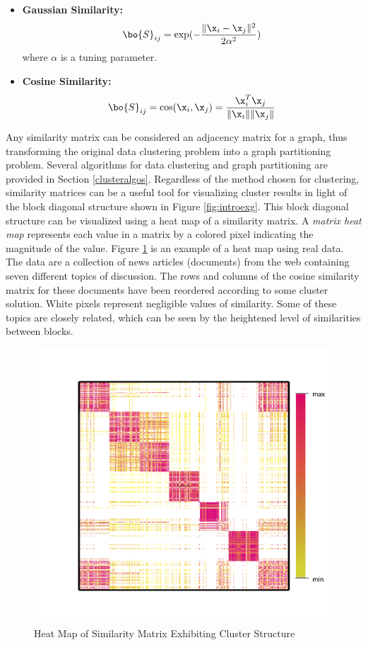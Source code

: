 \documentclass[
]{article}
\theoremstyle{definition}
\theoremstyle{definition}
\theoremstyle{definition}
\theoremstyle{definition}
\theoremstyle{remark}
\begin{document}
\begin{itemize}
\item \textbf{Gaussian Similarity:} $$\bo{S}_{ij} =\mbox{exp}(-\frac{\|\x_i-\x_j\|^2}{2\alpha^2})$$ where $\alpha$ is a tuning parameter.
\item \textbf{Cosine Similarity:} $$\bo{S}_{ij}=\cos (\x_i,\x_j) = \frac{\x_i^T\x_j}{\|\x_i\|\|\x_j\|}$$
\end{itemize}

Any similarity matrix can be considered an adjacency matrix for a graph, thus transforming the original data clustering problem into a graph partitioning problem. Several algorithms for data clustering and graph partitioning are provided in Section \ref{clusteralgos}. Regardless of the method chosen for clustering, similarity matrices can be a useful tool for visualizing cluster results in light of the block diagonal structure shown in Figure \ref{fig:introexg}. This block diagonal structure can be visualized using a heat map of a similarity matrix. A \emph{matrix heat map} represents each value in a matrix by a colored pixel indicating the magnitude of the value. Figure \ref{fig:heatmapex} is an example of a heat map using real data. The data are a collection of news articles (documents) from the web containing seven different topics of discussion. The rows and columns of the cosine similarity matrix for these documents have been reordered according to some cluster solution. White pixels represent negligible values of similarity. Some of these topics are closely related, which can be seen by the heightened level of similarities between blocks.

\begin{figure}

{\centering \includegraphics[width=0.5\linewidth]{figs/heatmapex} 

}

\caption{Heat Map of Similarity Matrix Exhibiting Cluster Structure}\label{fig:heatmapex}
\end{figure}
\end{document}
